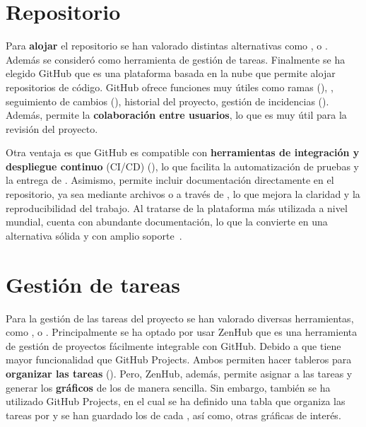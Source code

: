 \section{Repositorio}
Para \textbf{alojar} el repositorio se han valorado distintas alternativas como ,  o . Además se consideró  como herramienta de gestión de tareas. Finalmente se ha elegido GitHub que es una plataforma basada en la nube que permite alojar repositorios de código. GitHub ofrece funciones muy útiles como ramas (), , seguimiento de cambios (), historial del proyecto, gestión de incidencias (). Además, permite la \textbf{colaboración entre usuarios}, lo que es muy útil para la revisión del proyecto.

Otra ventaja es que GitHub es compatible con \textbf{herramientas de integración y despliegue continuo} (CI/CD) (), lo que facilita la automatización de pruebas y la entrega de . Asimismo, permite incluir documentación directamente en el repositorio, ya sea mediante archivos  o a través de , lo que mejora la claridad y la reproducibilidad del trabajo. Al tratarse de la plataforma más utilizada a nivel mundial, cuenta con abundante documentación, lo que la convierte en una alternativa sólida y con amplio soporte~\cite{gitHub}.

\section{Gestión de tareas}
Para la gestión de las tareas del proyecto se han valorado diversas herramientas, como ,  o . Principalmente se ha optado por usar ZenHub que es una herramienta de gestión de proyectos fácilmente integrable con GitHub. Debido a que tiene mayor funcionalidad que GitHub Projects. Ambos permiten hacer tableros  para \textbf{organizar las tareas} (). Pero, ZenHub, además, permite asignar  a las tareas y generar los \textbf{gráficos } de los  de manera sencilla. Sin embargo, también se ha utilizado GitHub Projects, en el cual se ha definido una tabla que organiza las tareas por  y se han guardado los  de cada , así como, otras gráficas de interés.

